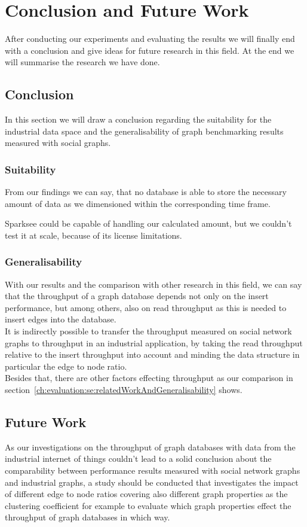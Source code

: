 \chapter{Conclusion and Future Work}
\label{ch:futureWork}
After conducting our experiments and evaluating the results we will finally end with a conclusion and give ideas for future research in this field.
At the end we will summarise the research we have done.

\section{Conclusion}
\label{ch:futureWork:se:conclusion}
In this section we will draw a conclusion regarding the suitability for the industrial data space and the generalisability of graph benchmarking results measured with social graphs.

\subsection{Suitability}
From our findings we can say,
that no database is able to store the necessary amount of data as we dimensioned within the corresponding time frame.

Sparksee could be capable of handling our calculated amount,
but we couldn't test it at scale,
because of its license limitations.

\subsection{Generalisability}
With our results and the comparison with other research in this field,
we can say that the throughput of a graph database depends not only on the insert performance,
but among others,
also on read throughput as this is needed to insert edges into the database.\\
It is indirectly possible to transfer the throughput measured on social network graphs to throughput in an industrial application,
by taking the read throughput relative to the insert throughput into account and minding the data structure in particular the edge to node ratio.\\
Besides that, there are other factors effecting throughput as our comparison in section~\ref{ch:evaluation:se:relatedWorkAndGeneralisability} shows.

\section{Future Work}
As our investigations on the throughput of graph databases with data from the industrial internet of things couldn't lead to a solid conclusion about the comparability between performance results measured with social network graphs and industrial graphs,
a study should be conducted that investigates the impact of different edge to node ratios covering also different graph properties as the clustering coefficient for example to evaluate which graph properties effect the throughput of graph databases in which way.

